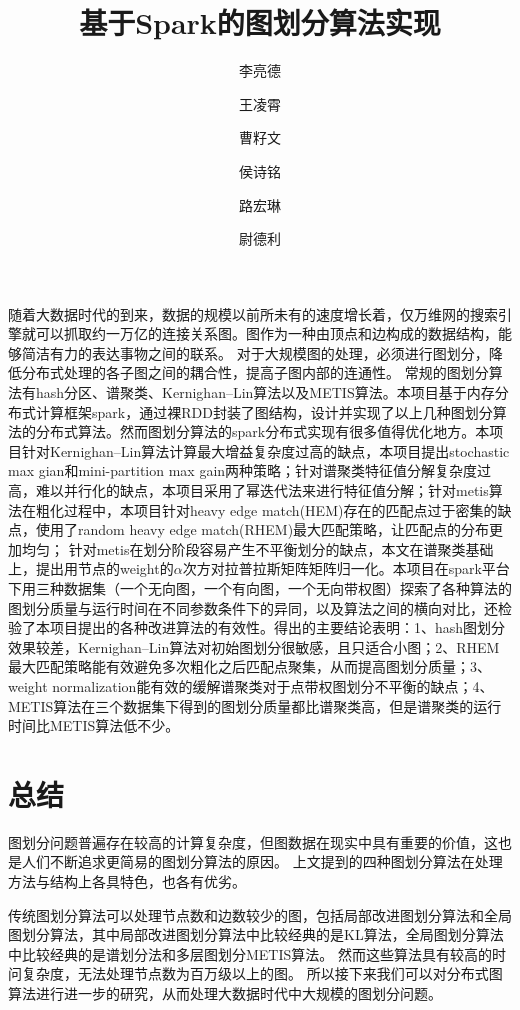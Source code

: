 \documentclass[UTF8,12pt]{ctexart} %
\theoremstyle{definition}
\begin{document}
\title{基于Spark的图划分算法实现}
\author[1]{李亮德}
\author[1]{王凌霄}
\author[2]{曹籽文}
\author[2]{侯诗铭}
\author[2]{路宏琳}
\author[3]{尉德利}
\renewcommand\Authands{, }

\maketitle

\renewcommand{\abstractname}{}
\begin{onecolabstract}
    随着大数据时代的到来，数据的规模以前所未有的速度增长着，仅万维网的搜索引擎就可以抓取约一万亿的连接关系图。图作为一种由顶点和边构成的数据结构，能够简洁有力的表达事物之间的联系。
    对于大规模图的处理，必须进行图划分，降低分布式处理的各子图之间的耦合性，提高子图内部的连通性。
    常规的图划分算法有hash分区、谱聚类、Kernighan–Lin算法以及METIS算法。本项目基于内存分布式计算框架spark，通过裸RDD封装了图结构，设计并实现了以上几种图划分算法的分布式算法。然而图划分算法的spark分布式实现有很多值得优化地方。本项目针对Kernighan–Lin算法计算最大增益复杂度过高的缺点，本项目提出stochastic max gian和mini-partition max gain两种策略；针对谱聚类特征值分解复杂度过高，难以并行化的缺点，本项目采用了幂迭代法来进行特征值分解；针对metis算法在粗化过程中，本项目针对heavy edge match(HEM)存在的匹配点过于密集的缺点，使用了random heavy edge match(RHEM)最大匹配策略，让匹配点的分布更加均匀；
    针对metis在划分阶段容易产生不平衡划分的缺点，本文在谱聚类基础上，提出用节点的weight的$\alpha$次方对拉普拉斯矩阵矩阵归一化。本项目在spark平台下用三种数据集（一个无向图，一个有向图，一个无向带权图）探索了各种算法的图划分质量与运行时间在不同参数条件下的异同，以及算法之间的横向对比，还检验了本项目提出的各种改进算法的有效性。得出的主要结论表明：1、hash图划分效果较差，Kernighan–Lin算法对初始图划分很敏感，且只适合小图；2、RHEM最大匹配策略能有效避免多次粗化之后匹配点聚集，从而提高图划分质量；3、weight normalization能有效的缓解谱聚类对于点带权图划分不平衡的缺点；4、METIS算法在三个数据集下得到的图划分质量都比谱聚类高，但是谱聚类的运行时间比METIS算法低不少。
\end{onecolabstract}

\newpage
\tableofcontents
\newpage




% 

\section{总结}

图划分问题普遍存在较高的计算复杂度，但图数据在现实中具有重要的价值，这也是人们不断追求更简易的图划分算法的原因。
上文提到的四种图划分算法在处理方法与结构上各具特色，也各有优劣。

传统图划分算法可以处理节点数和边数较少的图，包括局部改进图划分算法和全局图划分算法，其中局部改进图划分算法中比较经典的是KL算法，全局图划分算法中比较经典的是谱划分法和多层图划分METIS算法。
然而这些算法具有较高的时问复杂度，无法处理节点数为百万级以上的图。
所以接下来我们可以对分布式图算法进行进一步的研究，从而处理大数据时代中大规模的图划分问题。
\end{document}
